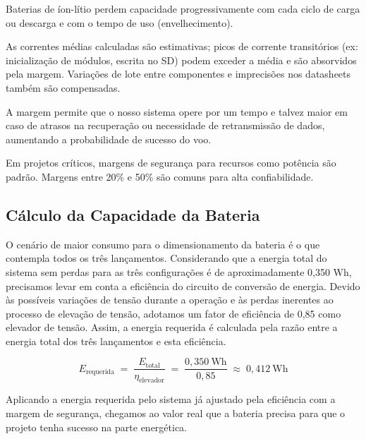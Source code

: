 Baterias de íon-lítio perdem capacidade progressivamente com cada ciclo de carga ou descarga e com o tempo de uso (envelhecimento). 

As correntes médias calculadas são estimativas; picos de corrente transitórios (ex: inicialização de módulos, escrita no SD) podem exceder a média e são absorvidos pela margem. Variações de lote entre componentes e imprecisões nos datasheets também são compensadas. 

A margem permite que o nosso sistema opere por um tempo e talvez maior em caso de atrasos na recuperação ou necessidade de retransmissão de dados, aumentando a probabilidade de sucesso do voo. 

Em projetos críticos, margens de segurança para recursos como potência são padrão. \cite{nasa2016} Margens entre 20\% e 50\% são comuns para alta confiabilidade. 


\subsection{Cálculo da Capacidade da Bateria}

O cenário de maior consumo para o dimensionamento da bateria é o que contempla todos os três lançamentos. Considerando que a energia total do sistema sem perdas para as três configurações é de aproximadamente 0,350 Wh, precisamos levar em conta a eficiência do circuito de conversão de energia. Devido às possíveis variações de tensão durante a operação e às perdas inerentes ao processo de elevação de tensão, adotamos um fator de eficiência de 0,85 como elevador de tensão. Assim, a energia requerida é calculada pela razão entre a energia total dos três lançamentos e esta eficiência.

\begin{equation}
E_{\text{requerida}}
\;=\;
\frac{E_{\text{total}}}{\eta_{\text{elevador}}}
\;=\;
\frac{0,350~\mathrm{Wh}}{0,85}
\;\approx\;
0,412~\mathrm{Wh}
\end{equation}

Aplicando a energia requerida pelo sistema já ajustado pela eficiência com a margem de segurança, chegamos ao valor real que a bateria precisa para que o projeto tenha sucesso na parte energética.

